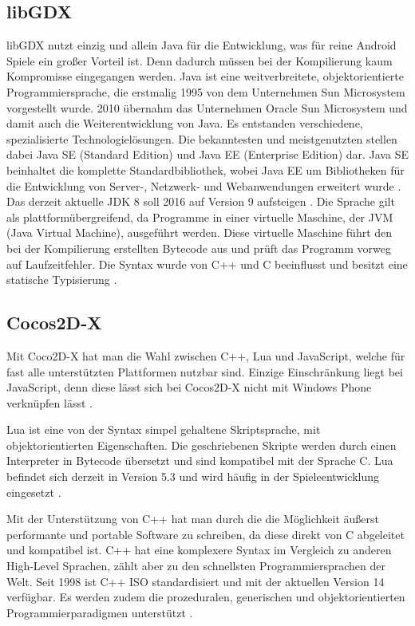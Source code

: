 \subsection{libGDX}
\label{subsec:libGDX}
libGDX nutzt einzig und allein Java für die Entwicklung, was für reine Android Spiele ein großer Vorteil ist. Denn dadurch müssen bei der Kompilierung kaum Kompromisse eingegangen werden.
Java ist eine weitverbreitete, objektorientierte Programmiersprache, die erstmalig 1995 von dem Unternehmen Sun Microsystem vorgestellt wurde. 2010 übernahm das Unternehmen Oracle Sun Microsystem und damit auch die Weiterentwicklung von Java. Es entstanden verschiedene, spezialisierte Technologielösungen. Die bekanntesten und meistgenutzten stellen dabei Java SE (Standard Edition) und Java EE (Enterprise Edition) dar. Java SE beinhaltet die komplette Standardbibliothek, wobei Java EE um Bibliotheken für die Entwicklung von Server-, Netzwerk- und Webanwendungen erweitert wurde \citep{java_kompakt}. Das derzeit aktuelle JDK 8 soll 2016 auf Version 9 aufsteigen \citep{java_9}. 
Die Sprache gilt als plattformübergreifend, da Programme in einer virtuelle Maschine, der JVM (Java Virtual Machine), ausgeführt werden. Diese virtuelle Maschine führt den bei der Kompilierung erstellten Bytecode aus und prüft das Programm vorweg auf Laufzeitfehler. 
Die Syntax wurde von C++ und C beeinflusst und besitzt eine statische Typisierung \citep{java_kompakt}. 

\subsection{Cocos2D-X}
Mit Coco2D-X hat man die Wahl zwischen C++, Lua und JavaScript, welche für fast alle unterstützten Plattformen nutzbar sind. Einzige Einschränkung liegt bei JavaScript, denn diese lässt sich bei Cocos2D-X nicht mit Windows Phone verknüpfen lässt \citep{cocos2d_main_features}. 

\bigskip
Lua ist eine von der Syntax simpel gehaltene Skriptsprache, mit objektorientierten Eigenschaften. Die geschriebenen Skripte werden durch einen Interpreter in Bytecode übersetzt und sind kompatibel mit der Sprache C. Lua befindet sich derzeit in Version 5.3 und wird häufig in der Spieleentwicklung eingesetzt \citep{lua_about}.

\bigskip
Mit der Unterstützung von C++ hat man durch die die Möglichkeit äußerst performante und portable Software zu schreiben, da diese direkt von C abgeleitet und kompatibel ist. C++ hat eine komplexere Syntax im Vergleich zu anderen High-Level Sprachen, zählt aber zu den schnellsten Programmiersprachen der Welt. Seit 1998 ist C++ ISO standardisiert und mit der aktuellen Version 14 verfügbar. Es werden zudem die prozeduralen, generischen und objektorientierten Programmierparadigmen unterstützt \citep{cplusplus}. 


